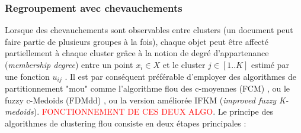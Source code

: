 
\subsubsection{Regroupement avec chevauchements}

Lorsque des chevauchements sont observables entre clusters (un document peut faire partie de plusieurs groupes à la fois), chaque objet peut être affecté partiellement à chaque cluster grâce à la notion de degré d'appartenance (\textit{membership degree}) entre un point $x_i \in X$ et le cluster $j \in [1..K]$ estimé par une fonction $u_{ij}$  \citep{baraldi1999surveyfuzzyclstering}. Il est par conséquent préférable d'employer des algorithmes de partitionnement "mou" comme l'algorithme flou des c-moyennes (FCM) \citep{bezdek1984fcm, hathaway1989fuzzycmeans}, ou le fuzzy c-Medoids (FDMdd) \citep{krishnapuram2001fuzzycmedoids}, ou la version améliorée IFKM (\textit{improved fuzzy K-medoids})\citep{sabzi2011fuzzykmedoids}. \textcolor{red}{FONCTIONNEMENT DE CES DEUX ALGO}. Le principe des algorithmes de clustering flou consiste en deux étapes principales \citep{sabzi2011fuzzykmedoids}: 


